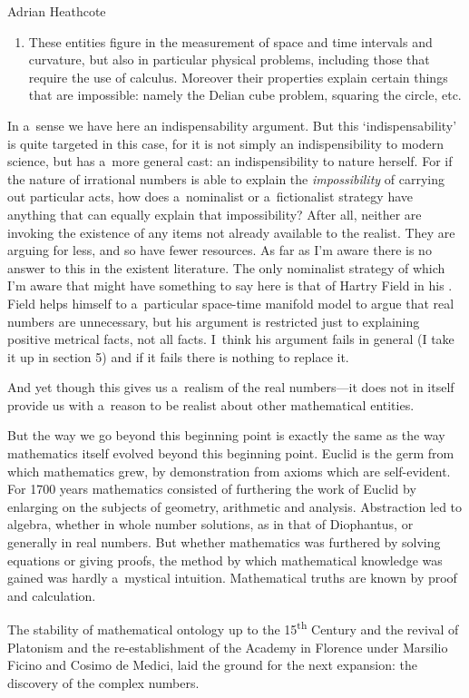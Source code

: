 \begin{artengenv}{Adrian Heathcote}
\begin{enumerate}[label=\emph{\alph*})]
  \item These entities figure in the measurement of space and time intervals  and curvature, but also in particular physical problems, including those that require the use of calculus. Moreover their properties explain certain things that are impossible: namely the Delian cube problem, squaring the circle, etc.
 \end{enumerate}
In a~sense we have here an indispensability argument. But this `indispensability' is quite targeted in this case, for it is not simply an indispensibility to modern science, but has a~more general cast: an indispensibility to nature herself. For if the nature of irrational numbers is able to explain the \textit{impossibility} of carrying out particular acts, how does a~nominalist or a~fictionalist strategy have anything that can equally explain that impossibility? After all, neither are invoking the existence of any items not already available to the realist. They are arguing for less, and so have fewer resources. As far as I'm aware there is no answer to this in the existent literature. The only nominalist strategy of which I'm aware that might have something to say here is that of Hartry Field in his \parencite*{field_science_1980}. Field helps himself to a~particular space-time manifold model to argue that real numbers are unnecessary, but his argument is restricted just to explaining positive metrical facts, not all facts. I~think his argument fails in general (I take it up in section 5) and if it fails there is nothing to replace it.

And yet though this gives us a~realism of the real numbers---it does not in itself provide us with a~reason to be realist about other mathematical entities.

But the way we go beyond this beginning point is exactly the same as the way mathematics itself evolved beyond this beginning point. Euclid is the germ from which mathematics grew, by demonstration from axioms which are self-evident. For 1700 years mathematics consisted of furthering the work of Euclid by enlarging on the subjects of geometry, arithmetic and analysis. Abstraction led to algebra, whether in whole number solutions, as in that of Diophantus, or generally in real numbers. But whether mathematics was furthered by solving equations or giving proofs, the method by which mathematical knowledge was gained was hardly a~mystical intuition. Mathematical truths are known by proof and calculation.

The stability of mathematical ontology up to the 15\textsuperscript{th} Century and the revival of Platonism and the re-establishment of the Academy in Florence under Marsilio Ficino and Cosimo de Medici, laid the ground for the next expansion: the discovery of the complex numbers.


\end{artengenv}
